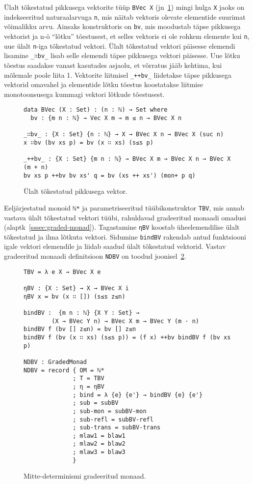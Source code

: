 \documentclass[a4paper,12pt]{article}
\begin{document}
Ülalt tõkestatud pikkusega vektorite tüüp {\tt BVec X} (jn~\ref{fig:nd.bvec}) mingi hulga {\tt X} jaoks on indekseeritud naturaalarvuga {\tt n}, mis näitab vektoris olevate elementide suurimat võimalikku arvu.
Ainsaks konstruktoris on {\tt bv}, mis moodustab täpse pikkusega vektorist ja n-ö ``lõtku'' tõestusest, et selles vektoris ei ole rohkem elemente kui {\tt n}, uue ülalt {\tt n}-iga tõkestatud vektori.
Ülalt tõkestatud vektori päisesse elemendi lisamine {\tt _∷bv_} lisab selle elemendi täpse pikkusega vektori päisesse. Uue lõtku tõestus saadakse vanast kasutades asjaolu, et võrratus jääb kehtima, kui mõlemale poole liita 1.
Vektorite liitmisel {\tt _++bv_} liidetakse täpse pikkusega vektorid omavahel ja elementide lõtku tõestus koostatakse liitmise monotoonsusega kummagi vektori lõtkude tõestusest.

\begin{figure}
  \begin{BVerbatim}
data BVec (X : Set) : (n : ℕ) → Set where
  bv : {m n : ℕ} → Vec X m → m ≤ n → BVec X n

_∷bv_ : {X : Set} {n : ℕ} → X → BVec X n → BVec X (suc n)
x ∷bv (bv xs p) = bv (x ∷ xs) (s≤s p)

_++bv_ : {X : Set} {m n : ℕ} → BVec X m → BVec X n → BVec X (m + n)
bv xs p ++bv bv xs' q = bv (xs ++ xs') (mon+ p q)    
  \end{BVerbatim}
  \caption{Ülalt tõkestatud pikkusega vektor.}
  \label{fig:nd.bvec}
\end{figure}

Eeljärjestatud monoid {\tt ℕ*} ja parametriseeritud tüübikonstruktor {\tt TBV}, mis annab vastava ülalt tõkestatud vektori tüübi, rahuldavad gradeeritud monaadi omadusi (alaptk~\ref{sssec:graded-monad}). Tagastamine {\tt ηBV} koostab üheelemendilise ülalt tõkestatud ja ilma lõtkuta vektori. Sidumine {\tt bindBV} rakendab antud funktsiooni igale vektori elemendile ja liidab saadud ülalt tõkestatud vektorid.
Vastav gradeeritud monaadi definitsioon {\tt NDBV} on toodud joonisel~\ref{fig:nd.graded-monad}.


\begin{figure}
  \begin{BVerbatim}
TBV = λ e X → BVec X e

ηBV : {X : Set} → X → BVec X i
ηBV x = bv (x ∷ []) (s≤s z≤n)

bindBV :  {m n : ℕ} {X Y : Set} →
        (X → BVec Y n) → BVec X m → BVec Y (m · n)
bindBV f (bv [] z≤n) = bv [] z≤n
bindBV f (bv (x ∷ xs) (s≤s p)) = (f x) ++bv bindBV f (bv xs p)

NDBV : GradedMonad
NDBV = record { OM = ℕ*
              ; T = TBV
              ; η = ηBV
              ; bind = λ {e} {e'} → bindBV {e} {e'}
              ; sub = subBV
              ; sub-mon = subBV-mon
              ; sub-refl = subBV-refl
              ; sub-trans = subBV-trans
              ; mlaw1 = blaw1
              ; mlaw2 = blaw2
              ; mlaw3 = blaw3
              }
  \end{BVerbatim}
  \caption{Mitte-determinismi gradeeritud monaad.}
  \label{fig:nd.graded-monad}
\end{figure}
\end{document}
